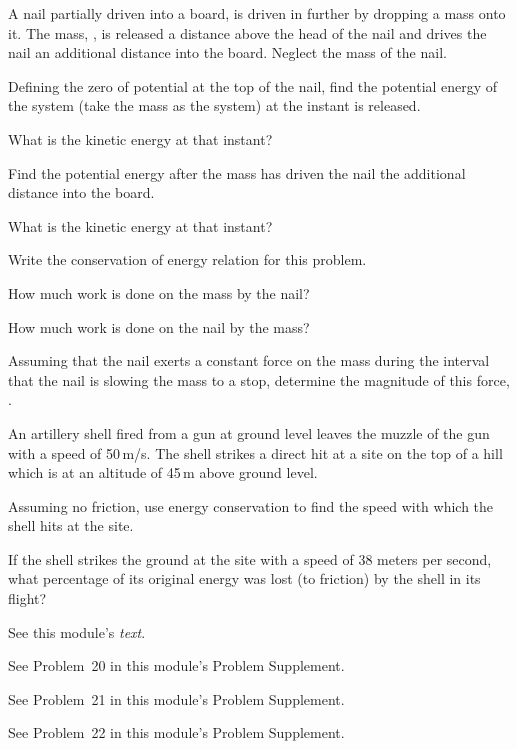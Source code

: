 {\begin{one-digit-list}
\item [3.] A nail partially driven into a board, is driven in further by
dropping a mass onto it.
The mass, , is released a distance  above the head of the nail and
drives the nail an additional distance  into the board.
Neglect the mass of the nail.
\begin{one-digit-list}
\item [a.] Defining the zero of potential at the top of the nail, find
the potential energy of the system (take the mass  as the system) at the
instant  is released.
\item [b.] What is the kinetic energy at that instant?
\item [c.] Find the potential energy after the mass has driven the nail the
additional distance  into the board.
\item [d.] What is the kinetic energy at that instant?
\item [e.] Write the conservation of energy relation for this problem.
\item [f.] How much work is done on the mass by the nail?
\item [g.] How much work is done on the nail by the mass?
\item [h.] Assuming that the nail exerts a constant force on the mass during
the interval that the nail is slowing the mass to a stop, determine the
magnitude of this force, .
\end{one-digit-list}

\item [4.] \noindent {}\newline
An artillery shell fired from a gun at ground level leaves the muzzle of the
gun with a speed of 50\,m/s.
The shell strikes a direct hit at a site on the top of a hill which is at an
altitude of 45\,m above ground level.
\begin{one-digit-list}
\item [a.] Assuming no friction, use energy conservation to find the speed with
which the shell hits at the site.
\item [b.] If the shell strikes the ground at the site with a speed of 38
meters per second, what percentage of its original energy was lost (to
friction) by the shell in its flight?
\end{one-digit-list}
\end{one-digit-list}

\BriefAns

\begin{one-digit-list}
\item [1.] See this module's \textit{text}.

\item [2.] See Problem~20 in this module's {Problem Supplement}.

\item [3.] See Problem~21 in this module's {Problem Supplement}.

\item [4.] See Problem~22 in this module's {Problem Supplement}.
\end{one-digit-list}

}%
